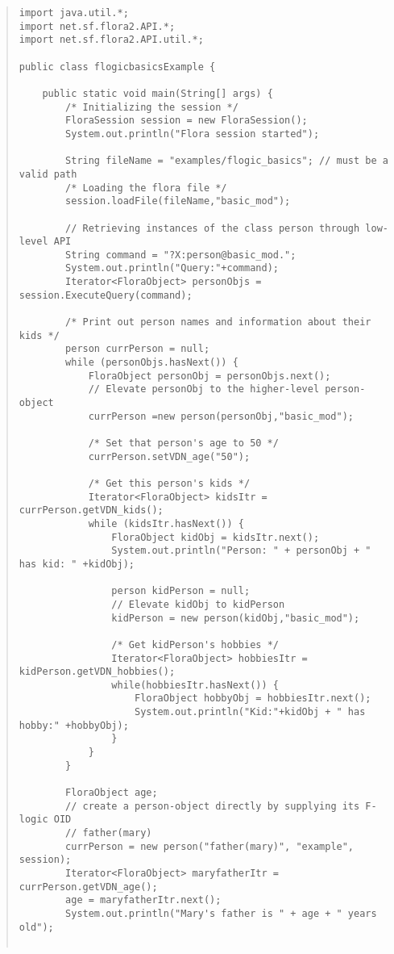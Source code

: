 \begin{quote}
\begin{verbatim}
import java.util.*;
import net.sf.flora2.API.*;
import net.sf.flora2.API.util.*;

public class flogicbasicsExample {

    public static void main(String[] args) {
        /* Initializing the session */
        FloraSession session = new FloraSession();
        System.out.println("Flora session started");

        String fileName = "examples/flogic_basics"; // must be a valid path
        /* Loading the flora file */
        session.loadFile(fileName,"basic_mod");

        // Retrieving instances of the class person through low-level API
        String command = "?X:person@basic_mod.";
        System.out.println("Query:"+command);
        Iterator<FloraObject> personObjs = session.ExecuteQuery(command);

        /* Print out person names and information about their kids */
        person currPerson = null;
        while (personObjs.hasNext()) {
            FloraObject personObj = personObjs.next();
            // Elevate personObj to the higher-level person-object
            currPerson =new person(personObj,"basic_mod");

            /* Set that person's age to 50 */
            currPerson.setVDN_age("50");

            /* Get this person's kids */
            Iterator<FloraObject> kidsItr = currPerson.getVDN_kids();
            while (kidsItr.hasNext()) {
                FloraObject kidObj = kidsItr.next();
                System.out.println("Person: " + personObj + " has kid: " +kidObj);

                person kidPerson = null;
                // Elevate kidObj to kidPerson
                kidPerson = new person(kidObj,"basic_mod");

                /* Get kidPerson's hobbies */
                Iterator<FloraObject> hobbiesItr = kidPerson.getVDN_hobbies();
                while(hobbiesItr.hasNext()) {
                    FloraObject hobbyObj = hobbiesItr.next();
                    System.out.println("Kid:"+kidObj + " has hobby:" +hobbyObj);
                }
            }
        }

        FloraObject age;
        // create a person-object directly by supplying its F-logic OID
        // father(mary)
        currPerson = new person("father(mary)", "example", session);
        Iterator<FloraObject> maryfatherItr = currPerson.getVDN_age();
        age = maryfatherItr.next();
        System.out.println("Mary's father is " + age + " years old");


\end{verbatim}
\end{quote}
